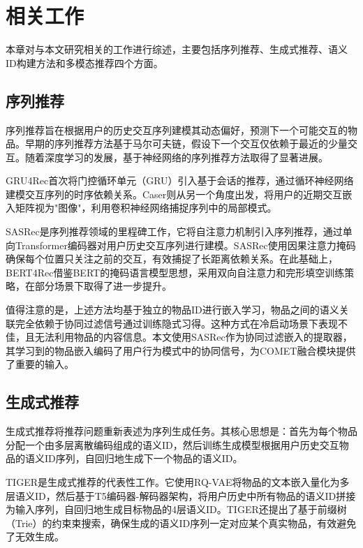 
\chapter{相关工作}

本章对与本文研究相关的工作进行综述，主要包括序列推荐、生成式推荐、语义ID构建方法和多模态推荐四个方面。

\section{序列推荐}

序列推荐旨在根据用户的历史交互序列建模其动态偏好，预测下一个可能交互的物品。早期的序列推荐方法基于马尔可夫链，假设下一个交互仅依赖于最近的少量交互\cite{rendle2010factorizing}。随着深度学习的发展，基于神经网络的序列推荐方法取得了显著进展。

GRU4Rec\cite{hidasi2016session}首次将门控循环单元（GRU）引入基于会话的推荐，通过循环神经网络建模交互序列的时序依赖关系。Caser\cite{tang2018personalized}则从另一个角度出发，将用户的近期交互嵌入矩阵视为"图像"，利用卷积神经网络捕捉序列中的局部模式。

SASRec\cite{kang2018self}是序列推荐领域的里程碑工作，它将自注意力机制引入序列推荐，通过单向Transformer编码器对用户历史交互序列进行建模。SASRec使用因果注意力掩码确保每个位置只关注之前的交互，有效捕捉了长距离依赖关系。在此基础上，BERT4Rec\cite{sun2019bert4rec}借鉴BERT的掩码语言模型思想，采用双向自注意力和完形填空训练策略，在部分场景下取得了进一步提升。

值得注意的是，上述方法均基于独立的物品ID进行嵌入学习，物品之间的语义关联完全依赖于协同过滤信号通过训练隐式习得。这种方式在冷启动场景下表现不佳，且无法利用物品的内容信息。本文使用SASRec作为协同过滤嵌入的提取器，其学习到的物品嵌入编码了用户行为模式中的协同信号，为COMET融合模块提供了重要的输入。

\section{生成式推荐}

生成式推荐将推荐问题重新表述为序列生成任务。其核心思想是：首先为每个物品分配一个由多层离散编码组成的语义ID，然后训练生成模型根据用户历史交互物品的语义ID序列，自回归地生成下一个物品的语义ID。

TIGER\cite{rajput2023recommender}是生成式推荐的代表性工作。它使用RQ-VAE将物品的文本嵌入量化为多层语义ID，然后基于T5\cite{raffel2020exploring}编码器-解码器架构，将用户历史中所有物品的语义ID拼接为输入序列，自回归地生成目标物品的4层语义ID。TIGER还提出了基于前缀树（Trie）的约束束搜索，确保生成的语义ID序列一定对应某个真实物品，有效避免了无效生成。

